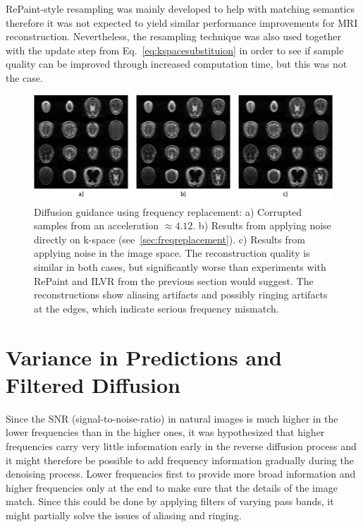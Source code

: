 RePaint-style resampling was mainly developed to help with matching semantics therefore it was not expected to yield similar performance improvements for MRI reconstruction. Nevertheless, the resampling technique was also used together with the update step from Eq.~\ref{eq:kspacesubstituion} in order to see if sample quality can be improved through increased computation time, but this was not the case.
\begin{figure}
    \centering
    \includegraphics[width=.6\textwidth]{images/freq_replacement.png}
    \caption[Frequency Replacement]{Diffusion guidance using frequency replacement: a) Corrupted samples from an acceleration $\approx 4.12$. b) Results from applying noise directly on k-space (see~\ref{sec:freqreplacement}). c) Results from applying noise in the image space. The reconstruction quality is similar in both cases, but significantly worse than experiments with RePaint and ILVR from the previous section would suggest. The reconstructions show aliasing artifacts and possibly ringing artifacts at the edges, which indicate serious frequency mismatch.}
    \label{fig:freqreplacement}
\end{figure}


\section{Variance in Predictions and Filtered Diffusion}
\label{sec:predvariance}
Since the SNR (signal-to-noise-ratio) in natural images is much higher in the lower frequencies than in the higher ones, it was hypothesized that higher frequencies carry very little information early in the reverse diffusion process and it might therefore be possible to add frequency information gradually during the denoising process. Lower frequencies first to provide more broad information and higher frequencies only at the end to make sure that the details of the image match. Since this could be done by applying filters of varying pass bands, it might partially solve the issues of aliasing and ringing.

